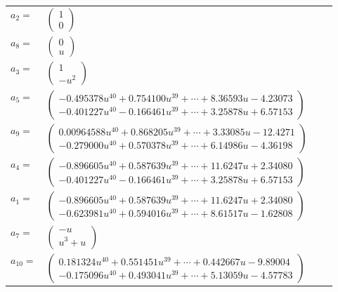 \documentclass[1p]{elsarticle_modified}
\theoremstyle{definition}
\begin{document}
\begin{tabular}{m{7pt} m{180pt} m{7pt} m{180pt} }
\flushright $a_{2}=$&$\begin{pmatrix}1\\0\end{pmatrix}$ \\
\flushright $a_{8}=$&$\begin{pmatrix}0\\u\end{pmatrix}$ \\
\flushright $a_{3}=$&$\begin{pmatrix}1\\- u^2\end{pmatrix}$ \\
\flushright $a_{5}=$&$\begin{pmatrix}-0.495378 u^{40}+0.754100 u^{39}+\cdots+8.36593 u-4.23073\\-0.401227 u^{40}-0.166461 u^{39}+\cdots+3.25878 u+6.57153\end{pmatrix}$ \\
\flushright $a_{9}=$&$\begin{pmatrix}0.00964588 u^{40}+0.868205 u^{39}+\cdots+3.33085 u-12.4271\\-0.279000 u^{40}+0.570378 u^{39}+\cdots+6.14986 u-4.36198\end{pmatrix}$ \\
\flushright $a_{4}=$&$\begin{pmatrix}-0.896605 u^{40}+0.587639 u^{39}+\cdots+11.6247 u+2.34080\\-0.401227 u^{40}-0.166461 u^{39}+\cdots+3.25878 u+6.57153\end{pmatrix}$ \\
\flushright $a_{1}=$&$\begin{pmatrix}-0.896605 u^{40}+0.587639 u^{39}+\cdots+11.6247 u+2.34080\\-0.623981 u^{40}+0.594016 u^{39}+\cdots+8.61517 u-1.62808\end{pmatrix}$ \\
\flushright $a_{7}=$&$\begin{pmatrix}- u\\u^3+u\end{pmatrix}$ \\
\flushright $a_{10}=$&$\begin{pmatrix}0.181324 u^{40}+0.551451 u^{39}+\cdots+0.442667 u-9.89004\\-0.175096 u^{40}+0.493041 u^{39}+\cdots+5.13059 u-4.57783\end{pmatrix}$ \\

\end{tabular}
\end{document}
